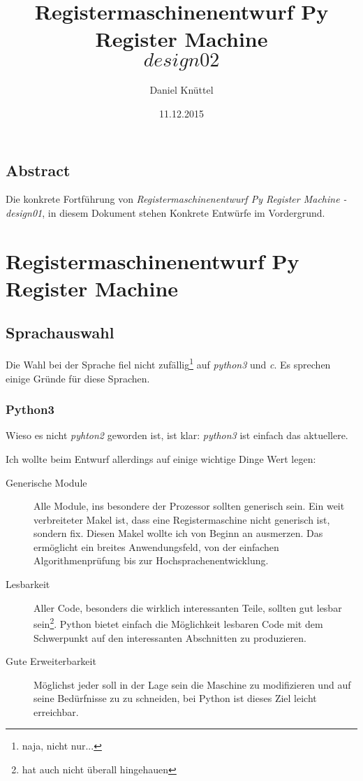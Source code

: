 \documentclass[a4paper,12pt,oneside]{scrreprt}
\title{ Registermaschinenentwurf Py Register Machine \[design02\]}
\author{Daniel Knüttel}
\date{11.12.2015}
\begin{document}
\maketitle
\tableofcontents

\chapter{Abstract}

Die konkrete Fortführung von \textit{Registermaschinenentwurf Py Register Machine - design01}, in diesem Dokument stehen Konkrete Entwürfe im Vordergrund.

\part{Registermaschinenentwurf Py Register Machine}

\chapter{Sprachauswahl}

Die Wahl bei der Sprache fiel nicht zufällig\footnote{naja, nicht nur...} auf \textit{python3} und \textit{c}. Es sprechen einige Gründe für diese Sprachen.

\section{Python3}

Wieso es nicht \textit{pyhton2} geworden ist, ist klar: \textit{python3} ist einfach das aktuellere.

Ich wollte beim Entwurf allerdings auf einige wichtige Dinge Wert legen:

\begin{description}
\item[Generische Module] Alle Module, ins besondere der Prozessor sollten generisch sein. Ein weit verbreiteter Makel 
ist, dass eine Registermaschine nicht generisch ist, sondern fix. Diesen Makel wollte ich von Beginn an ausmerzen.
Das ermöglicht ein breites Anwendungsfeld, von der einfachen Algorithmenprüfung bis zur Hochsprachenentwicklung.

\item[Lesbarkeit] Aller Code, besonders die wirklich interessanten Teile, sollten gut lesbar sein\footnote{hat auch nicht überall hingehauen}. Python bietet einfach die Möglichkeit lesbaren Code mit dem Schwerpunkt auf den interessanten Abschnitten zu produzieren.

\item[Gute Erweiterbarkeit] Möglichst jeder soll in der Lage sein die Maschine zu modifizieren und auf seine Bedürfnisse zu zu schneiden, bei Python ist dieses Ziel leicht erreichbar.
\end{description}
\end{document}
